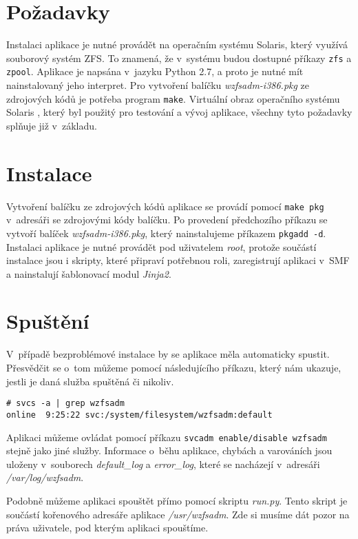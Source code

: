 \section{Požadavky}
Instalaci aplikace je nutné provádět na operačním systému Solaris, který využívá souborový systém ZFS. To znamená, že v~systému budou dostupné příkazy \verb|zfs| a \verb|zpool|. Aplikace je napsána v~jazyku Python 2.7, a proto je nutné mít nainstalovaný jeho interpret. Pro vytvoření balíčku \emph{wzfsadm-i386.pkg} ze zdrojových kódů je potřeba program \verb|make|. Virtuální obraz operačního systému Solaris \cite{vb}, který byl použitý pro testování a vývoj aplikace, všechny tyto požadavky splňuje již v~základu.
\section{Instalace}
Vytvoření balíčku ze zdrojových kódů aplikace se provádí pomocí \verb|make pkg| v~adresáři se zdrojovými kódy balíčku. Po provedení předchozího příkazu se vytvoří balíček \emph{wzfsadm-i386.pkg}, který nainstalujeme příkazem \verb|pkgadd -d|. Instalaci aplikace je nutné provádět pod uživatelem \emph{root}, protože součástí instalace jsou i skripty, které připraví potřebnou roli, zaregistrují aplikaci v~SMF a nainstalují šablonovací modul \emph{Jinja2}.
\section{Spuštění}
V~případě bezproblémové instalace by se aplikace měla automaticky spustit. Přesvědčit se o~tom můžeme pomocí následujícího příkazu, který nám ukazuje, jestli je daná služba spuštěná či nikoliv.
\begin{verbatim}
# svcs -a | grep wzfsadm
online  9:25:22 svc:/system/filesystem/wzfsadm:default
\end{verbatim}
Aplikaci můžeme ovládat pomocí příkazu \verb|svcadm enable/disable wzfsadm| stejně jako jiné služby. Informace o~běhu aplikace, chybách a varováních jsou uloženy v~souborech \emph{default\_log} a \emph{error\_log}, které se nacházejí v~adresáři \emph{/var/log/wzfsadm}.

Podobně můžeme aplikaci spouštět přímo pomocí skriptu \emph{run.py}. Tento skript je součástí kořenového adresáře aplikace \emph{/usr/wzfsadm}. Zde si musíme dát pozor na práva uživatele, pod kterým aplikaci spouštíme.

